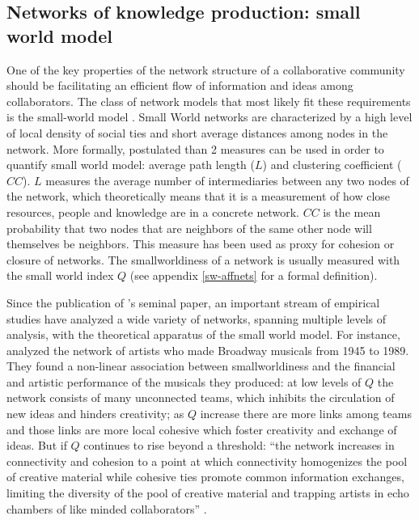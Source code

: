 \subsection{Networks of knowledge production: small world model}

One of the key properties of the network structure of a collaborative community should be facilitating an efficient flow of information and ideas among collaborators. The class of network models that most likely fit these requirements is the small-world model \citep{watts:1998}. Small World networks are characterized by a high level of local density of social ties and short average distances among nodes in the network. More formally,\citet{watts:1998} postulated than 2 measures can be used in order to quantify small world model: average path length ($L$) and clustering coefficient ($CC$). $L$ measures the average number of intermediaries between any two nodes of the network, which theoretically means that it is a measurement of how close resources, people and knowledge are in a concrete network. $CC$ is the mean probability that two nodes that are neighbors of the same other node will themselves be neighbors. This measure has been used as proxy for cohesion or closure of networks. The smallworldiness of a network is usually measured with the small world index $Q$ (see appendix \ref{sw-affnets} for a formal definition).

Since the publication of \citeauthor{watts:1998}'s seminal paper, an important stream of empirical studies have analyzed a wide variety of networks, spanning multiple levels of analysis, with the theoretical apparatus of the small world model. For instance, \citet{uzzi:2005} analyzed the network of artists who made Broadway musicals from 1945 to 1989. They found a non-linear association between smallworldiness and the financial and artistic performance of the musicals they produced: at low levels of $Q$ the network consists of many unconnected teams, which inhibits the circulation of new ideas and hinders creativity; as $Q$ increase there are more links among teams and those links are more local cohesive which foster creativity and exchange of ideas. But if $Q$ continues to rise beyond a threshold: ``the network increases in connectivity and cohesion to a point at which connectivity homogenizes the pool of creative material while cohesive ties promote common information exchanges, limiting the diversity of the pool of creative material and trapping artists in echo chambers of like minded collaborators'' \citep[87]{uzzi:2007}.

